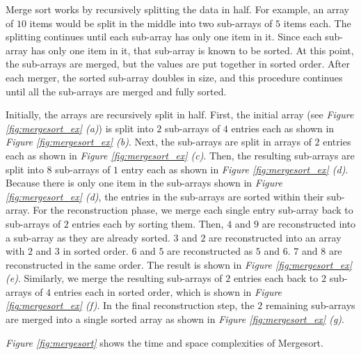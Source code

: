 Merge sort works by recursively splitting the data in half. For example, an array of $10$ items would be split in the middle into two sub-arrays of $5$ items each. The splitting continues until each sub-array has only one item in it. Since each sub-array has only one item in it, that sub-array is known to be sorted. At this point, the sub-arrays are merged, but the values are put together in sorted order. After each merger, the sorted sub-array doubles in size, and this procedure continues until all the sub-arrays are merged and fully sorted.

Initially, the arrays are recursively split in half. First, the initial array (see \textit{Figure \ref{fig:mergesort_ex} (a)}) is split into $2$ sub-arrays of $4$ entries each as shown in \textit{Figure \ref{fig:mergesort_ex} (b)}. Next, the sub-arrays are split in arrays of $2$ entries each as shown in \textit{Figure \ref{fig:mergesort_ex} (c)}. Then, the resulting sub-arrays are split into $8$ sub-arrays of $1$ entry each as shown in \textit{Figure \ref{fig:mergesort_ex} (d)}. Because there is only one item in the sub-arrays shown in \textit{Figure \ref{fig:mergesort_ex} (d)}, the entries in the sub-arrays are sorted within their sub-array. For the reconstruction phase, we merge each single entry sub-array back to sub-arrays of $2$ entries each by sorting them. Then, $4$ and $9$ are reconstructed into a sub-array as they are already sorted. $3$ and $2$ are reconstructed into an array with $2$ and $3$ in sorted order. $6$ and $5$ are reconstructed as $5$ and $6$. $7$ and $8$ are reconstructed in the same order. The result is shown in \textit{Figure \ref{fig:mergesort_ex} (e)}. Similarly, we merge the resulting sub-arrays of $2$ entries each back to $2$ sub-arrays of $4$ entries each in sorted order, which is shown in \textit{Figure \ref{fig:mergesort_ex} (f)}. In the final reconstruction step, the $2$ remaining sub-arrays are merged into a single sorted array as shown in \textit{Figure \ref{fig:mergesort_ex} (g)}.

\textit{Figure \ref{fig:mergesort}} shows the time and space complexities of Mergesort.

